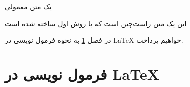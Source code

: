 \documentclass[12pt]{book}
\begin{document}
یک متن معمولی
\begin{flushright}
			این یک متن راست‌چین است که با روش اول ساخته شده‌ است
\end{flushright}

در فصل
\ref{writingFormula}
به نحوه فرمول نویسی در
\LaTeX
خواهیم پرداخت.



\chapter{فرمول نویسی در \LaTeX}\label{writingFormula}
\end{document}
